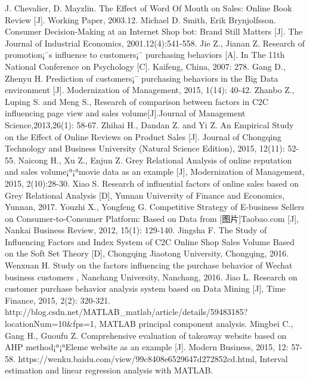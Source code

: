 \begin{thebibliography}{}
	 J. Chevalier, D. Mayzlin. The Effect of Word Of Mouth on Sales: Online Book Review [J]. Working Paper, 2003.12. 
	 Michael D. Smith, Erik Brynjolfsson. Consumer Decision-Making at an Internet Shop bot: Brand Still Matters [J]. The Journal of Industrial Economics, 2001.12(4):541-558. 
	 Jie Z., Jianan Z. Research of promotion¡¯s influence to customers¡¯ purchasing behaviors [A]. In The 11th National Conference on Psychology [C]. Kaifeng, China, 2007: 278. 
	 Gang D., Zhenyu H. Prediction of customers¡¯ purchasing behaviors in the Big Data environment [J]. Modernization of Management, 2015, 1(14): 40-42. 
	 Zhanbo Z., Luping S. and Meng S., Research of comparison between factors in C2C influencing page view and sales volume[J].Journal of Management Science,2013,26(1): 58-67. 
	 Zhihai H., Dandan Z. and Yi Z. An Empirical Study on the Effect of Online Reviews on Product Sales [J]. Journal of Chongqing Technology and Business University (Natural Science Edition), 2015, 12(11): 52-55.
	 Naicong H., Xu Z., Enjun Z. Grey Relational Analysis of online reputation and sales volume¡ª¡ªmovie data as an example [J], Modernization of Management, 2015, 2(10):28-30. 
	 Xiao S. Research of influential factors of online sales based on Grey Relational Analysis [D], Yunnan University of Finance and Economics, Yunnan, 2017.
	 Youzhi X., Yongfeng G. Competitive Strategy of E-business Sellers on Consumer-to-Consumer Platform: Based on Data from [图片]Taobao.com [J], Nankai Business Review, 2012, 15(1): 129-140. 
	 Jingsha F. The Study of Influencing Factors and Index System of C2C Online Shop Sales Volume Based on the Soft Set Theory [D], Chongqing Jiaotong University, Chongqing, 2016.
	 Wenxuan H. Study on the factors influencing the purchase behavior of Wechat business customers , Nanchang University, Nanchang, 2016. 
	 Jiao L. Research on customer purchase behavior analysis system based on Data Mining [J], Time Finance, 2015, 2(2): 320-321. 
	 http://blog.csdn.net/MATLAB\_matlab/article/details/59483185?locationNum=10\&fps=1, MATLAB principal component analysis.
	 Mingbei C., Gang H., Guoufu Z. Comprehensive evaluation of takeaway website based on AHP method¡ª¡ªEleme website as an example [J]. Modern Business, 2015, 12: 57-58.
	 https://wenku.baidu.com/view/99c8408e6529647d272852cd.html, Interval estimation and linear regression analysis with MATLAB.

\end{thebibliography}
